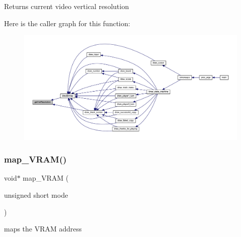 \begin{DoxyReturn}{Returns}
current video vertical resolution 
\end{DoxyReturn}
Here is the caller graph for this function\+:\nopagebreak
\begin{figure}[H]
\begin{center}
\leavevmode
\includegraphics[width=350pt]{group__video__gr_ga7ee85b0f333d227380a2c43e5fb8507a_icgraph}
\end{center}
\end{figure}
\mbox{\label{group__video__gr_ga06d4b54021d33d2447a61b9de3982810}} 
\subsubsection{\texorpdfstring{map\+\_\+\+V\+R\+A\+M()}{map\_VRAM()}}
{\footnotesize\ttfamily void$\ast$ map\+\_\+\+V\+R\+AM (\begin{DoxyParamCaption}\item[{unsigned short}]{mode }\end{DoxyParamCaption})}



maps the V\+R\+AM address 


